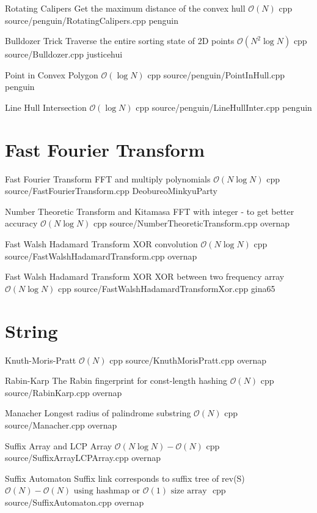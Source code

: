 \documentclass[landscape, 10pt, a4paper, oneside, twocolumn]{extarticle}
\begin{document}
\Algorithm
{Rotating Calipers}
{Get the maximum distance of the convex hull}
{$\mathcal{O}(N)$}
{cpp}
{source/penguin/RotatingCalipers.cpp}
{penguin}

\Algorithm
{Bulldozer Trick}
{Traverse the entire sorting state of 2D points}
{$\mathcal{O}(N^2\log{N})$}
{cpp}
{source/Bulldozer.cpp}
{justicehui}

\Algorithm
{Point in Convex Polygon}
{}
{$\mathcal{O}(\log{N})$}
{cpp}
{source/penguin/PointInHull.cpp}
{penguin}

\Algorithm
{Line Hull Intersection}
{}
{$\mathcal{O}(\log{N})$}
{cpp}
{source/penguin/LineHullInter.cpp}
{penguin}


\section{Fast Fourier Transform}

\Algorithm
{Fast Fourier Transform}
{FFT and multiply polynomials}
{$\mathcal{O}(N\log{N})$}
{cpp}
{source/FastFourierTransform.cpp}
{DeobureoMinkyuParty}

\Algorithm
{Number Theoretic Transform and Kitamasa}
{FFT with integer - to get better accuracy}
{$\mathcal{O}(N\log{N})$}
{cpp}
{source/NumberTheoreticTransform.cpp}
{overnap}

\Algorithm
{Fast Walsh Hadamard Transform}
{XOR convolution}
{$\mathcal{O}(N\log{N})$}
{cpp}
{source/FastWalshHadamardTransform.cpp}
{overnap}

\Algorithm
{Fast Walsh Hadamard Transform XOR}
{XOR between two frequency array}
{$\mathcal{O}(N\log{N})$}
{cpp}
{source/FastWalshHadamardTransformXor.cpp}
{gina65}

\section{String}

\Algorithm
{Knuth-Moris-Pratt}
{}
{$\mathcal{O}(N)$}
{cpp}
{source/KnuthMorisPratt.cpp}
{overnap}

\Algorithm
{Rabin-Karp}
{The Rabin fingerprint for const-length hashing}
{$\mathcal{O}(N)$}
{cpp}
{source/RabinKarp.cpp}
{overnap}

\Algorithm
{Manacher}
{Longest radius of palindrome substring}
{$\mathcal{O}(N)$}
{cpp}
{source/Manacher.cpp}
{overnap}

\Algorithm
{Suffix Array and LCP Array}
{}
{$\mathcal{O}(N\log{N})-\mathcal{O}(N)$}
{cpp}
{source/SuffixArrayLCPArray.cpp}
{overnap}

\Algorithm
{Suffix Automaton}
{Suffix link corresponds to suffix tree of rev(S)}
{$\mathcal{O}(N)-\mathcal{O}(N)\text{ using hashmap or $\mathcal{O}(1)$ size array }$}
{cpp}
{source/SuffixAutomaton.cpp}
{overnap}
\end{document}
